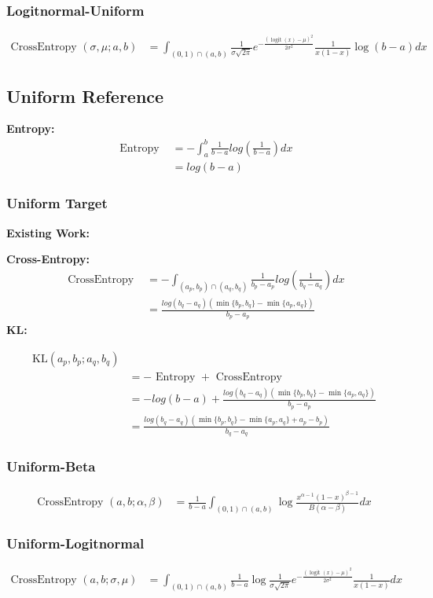 \documentclass{article}
\begin{document}
\subsubsection{Logitnormal-Uniform}
$$ \begin{aligned} \text {CrossEntropy }\left(\sigma, \mu;a,b \right)&=
\int_{(0,1)\cap(a,b) }\frac{1}{\sigma \sqrt{2 \pi}} e^{-\frac{(\operatorname{logit}(x)-\mu)^{2}}{2 \sigma^{2}}} \frac{1}{x(1-x)}\log{(b-a)}dx
\end{aligned} $$


\subsection{Uniform Reference}

\noindent \textbf{Entropy:}
$$ \begin{aligned} \text { Entropy }&=-\int_{a}^{b}\frac{1}{b-a}log(\frac{1}{b-a})dx\\&=log(b-a)
\end{aligned} $$

\subsubsection{Uniform Target}

\noindent \textbf{Existing Work:}

\noindent \textbf{Cross-Entropy:}
$$ \begin{aligned} \text { CrossEntropy }&=-\int_{(a_{p},b_{p}) \cap (a_{q},b_{q}) }\frac{1}{b_{p}-a_{p}}log(\frac{1}{b_{q}-a_{q}})dx \\&=\frac{log(b_{q}-a_{q})(\min \{b_{p},b_{q}\}-\min \{a_{p},a_{q}\})}{b_{p}-a_{p}}
\end{aligned} $$
\noindent \textbf{KL:}

$$ \begin{aligned}
\mathrm{KL}\left(a_{p}, b_{p} ; a_{q},b_{q}\right)\\&=-\text { Entropy }+\text { CrossEntropy }\\&=-log(b-a)+\frac{log(b_{q}-a_{q})(\min \{b_{p},b_{q}\}-\min \{a_{p},a_{q}\})}{b_{p}-a_{p}}\\&=\frac{log(b_{q}-a_{q})(\min \{b_{p},b_{q}\}-\min \{a_{p},a_{q}\}+a_{p}-b_{p})}{b_{q}-a_{q}}
\end{aligned} $$

\subsubsection{Uniform-Beta}
$$ \begin{aligned} \text {CrossEntropy }\left( a, b;\alpha, \beta \right)&=\frac{1}{b-a}
\int_{(0,1)\cap(a,b) }\log{\frac{x^{\alpha-1}(1-x)^{\beta-1}}{B(\alpha-\beta)}} dx
\end{aligned} $$


\subsubsection{Uniform-Logitnormal}
$$ \begin{aligned} \text {CrossEntropy }\left(a,b;\sigma, \mu \right)&=
\int_{(0,1)\cap(a,b) }\frac{1}{b-a}\log{\frac{1}{\sigma \sqrt{2 \pi}} e^{-\frac{(\operatorname{logit}(x)-\mu)^{2}}{2 \sigma^{2}}} \frac{1}{x(1-x)}}dx
\end{aligned} $$
\end{document}
